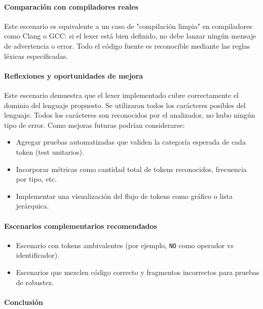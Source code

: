 \documentclass{article}
\begin{document}
\paragraph{Comparación con compiladores reales}

Este escenario es equivalente a un caso de "compilación limpia" en compiladores como Clang o GCC: si el lexer está bien definido, no debe lanzar ningún mensaje de advertencia o error. Todo el código fuente es reconocible mediante las reglas léxicas especificadas.

\paragraph{Reflexiones y oportunidades de mejora}

Este escenario demuestra que el lexer implementado cubre correctamente el dominio del lenguaje propuesto. Se utilizaron todos los carácteres posibles del lenguaje. Todos los carácteres son reconocidos por el analizador, no hubo ningún tipo de error. Como mejoras futuras podrían considerarse:

\begin{itemize}
  \item Agregar pruebas automatizadas que validen la categoría esperada de cada token (test unitarios).
  \item Incorporar métricas como cantidad total de tokens reconocidos, frecuencia por tipo, etc.
  \item Implementar una visualización del flujo de tokens como gráfico o lista jerárquica.
\end{itemize}

\paragraph{Escenarios complementarios recomendados}

\begin{itemize}
  \item Escenario con tokens ambivalentes (por ejemplo, \texttt{NO} como operador vs identificador).
  \item Escenarios que mezclen código correcto y fragmentos incorrectos para pruebas de robustez.
\end{itemize}

\paragraph{Conclusión}
\end{document}
